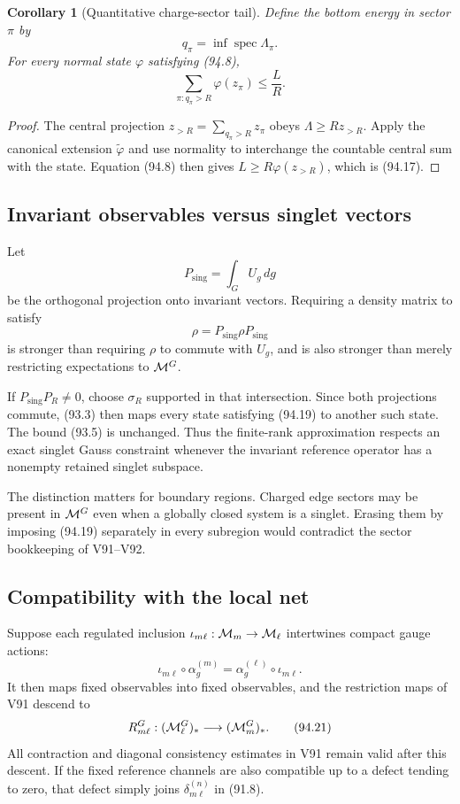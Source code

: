 \documentclass[11pt]{article}
\newtheorem{corollary}[theorem]{Corollary}
\theoremstyle{remark}
\begin{document}
\begin{corollary}[Quantitative charge-sector tail]
\label{cor:v12v94-sector}
Define the bottom energy in sector \(\pi\) by
\[
 q_\pi=\inf\operatorname{spec}\Lambda_\pi.                       \tag{94.16}
\]
For every normal state \(\varphi\) satisfying (94.8),
\[
 \sum_{\pi:q_\pi>R}\varphi(z_\pi)\leq\frac{L}{R}.                 \tag{94.17}
\]
\end{corollary}

\begin{proof}
The central projection
\(z_{>R}=\sum_{q_\pi>R}z_\pi\) obeys
\(\Lambda\geq Rz_{>R}\).  Apply the canonical extension
\(\widetilde\varphi\) and use normality to interchange the countable
central sum with the state.  Equation (94.8) then gives
\(L\geq R\varphi(z_{>R})\), which is (94.17).
\end{proof}

\subsection{Invariant observables versus singlet vectors}

Let
\[
 P_{\mathrm{sing}}=\int_GU_g\,dg                                \tag{94.18}
\]
be the orthogonal projection onto invariant vectors.  Requiring a
density matrix to satisfy
\[
 \rho=P_{\mathrm{sing}}\rho P_{\mathrm{sing}}                    \tag{94.19}
\]
is stronger than requiring \(\rho\) to commute with \(U_g\), and is
also stronger than merely restricting expectations to
\({\cal M}^G\).

If \(P_{\mathrm{sing}}P_R\neq0\), choose \(\sigma_R\) supported in
that intersection.  Since both projections commute, (93.3) then
maps every state satisfying (94.19) to another such state.  The
bound (93.5) is unchanged.  Thus the finite-rank approximation
respects an exact singlet Gauss constraint whenever the invariant
reference operator has a nonempty retained singlet subspace.

The distinction matters for boundary regions.  Charged edge sectors
may be present in \({\cal M}^G\) even when a globally closed system
is a singlet.  Erasing them by imposing (94.19) separately in every
subregion would contradict the sector bookkeeping of V91--V92.

\subsection{Compatibility with the local net}

Suppose each regulated inclusion
\(\iota_{m\ell}:{\cal M}_m\to{\cal M}_\ell\) intertwines compact
gauge actions:
\[
 \iota_{m\ell}\circ\alpha_g^{(m)}
 =\alpha_g^{(\ell)}\circ\iota_{m\ell}.                            \tag{94.20}
\]
It then maps fixed observables into fixed observables, and the
restriction maps of V91 descend to
\[
 R_{m\ell}^G:({\cal M}_\ell^{G})_*
 \longrightarrow({\cal M}_m^{G})_*.                             \tag{94.21}
\]
All contraction and diagonal consistency estimates in V91 remain
valid after this descent.  If the fixed reference channels are also
compatible up to a defect tending to zero, that defect simply joins
\(\delta_{m\ell}^{(n)}\) in (91.8).
\end{document}
